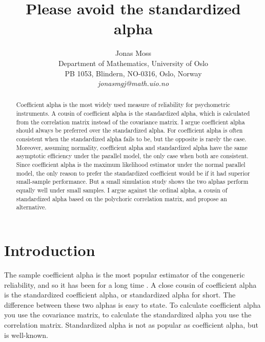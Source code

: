 \documentclass[twoside]{article}
\title{Please avoid the standardized alpha}
\author{
  Jonas Moss \orcid{0000-0002-6876-6964} \\
  Department of Mathematics, University of Oslo\\
  PB 1053, Blindern, NO-0316, Oslo, Norway \\
  \it{jonasmgj@math.uio.no}
}
\begin{document}
\maketitle

\begin{abstract}
Coefficient alpha is the most widely used measure of reliability for psychometric instruments. A cousin of coefficient alpha is the standardized alpha, which is calculated from the correlation matrix instead of the covariance matrix. I argue coefficient alpha should always be preferred over the standardized alpha. For coefficient alpha is often consistent when the standardized alpha fails to be, but the opposite is rarely the case. Moreover, assuming normality, coefficient alpha and standardized alpha have the same asymptotic efficiency under the parallel model, the only case when both are consistent. Since coefficient alpha is the maximum likelihood estimator under the normal parallel model, the only reason to prefer the standardized coefficient would be if it had superior small-sample performance. But a small simulation study shows the two alphas perform equally well under small samples. I argue against the ordinal alpha, a cousin of standardized alpha based on the polychoric correlation matrix, and propose an alternative.
\end{abstract}


\section{Introduction}

The sample coefficient alpha is the most popular estimator of the congeneric reliability, and so it has been for a long time \citep{McNeish2018-vu}. A close cousin of coefficient alpha is the standardized coefficient alpha, or standardized alpha for short. The difference between these two alphas is easy to state. To calculate coefficient alpha you use the covariance matrix, to calculate the standardized alpha you use the correlation matrix. Standardized alpha is not as popular as coefficient alpha, but is well-known.

\end{document}

